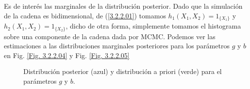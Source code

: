 Es de interés las marginales de la distribución posterior. Dado que la simulación de la cadena es bidimensional, de (\ref{3.2.2.01}) tomamos $h_1(X_1,X_2) = 1_{\{X_1\}}$ y $h_2(X_1,X_2)= 1_{\{X_2\}}$, dicho de otra forma, simplemente tomamos el histograma sobre una componente de la cadena dada por MCMC. Podemos ver las estimaciones a las distribuciones marginales posteriores para los parámetros $g$ y $b$ en  Fig. \ref{Fig. 3.2.2.04} y Fig. \ref{Fig. 3.2.2.05}

\begin{figure}[h]
    \centering
    \qquad
    \caption{Distribución posterior (azul) y distribución a priori (verde) para el parámetros $g$ y $b$. }
    \label{Fig. 3.2.gravedad.theta}
\end{figure}



